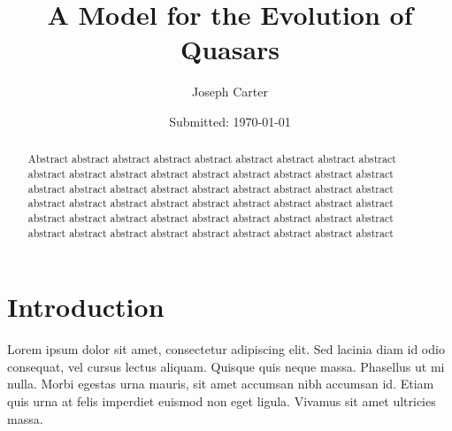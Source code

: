 \documentclass[12pt, onecolumn]{revtex4}    %
\begin{document}
                     


\title{A Model for the Evolution of Quasars} 
\date{Submitted: \today{}}
\author{Joseph Carter}

\begin{abstract}              
 
Abstract abstract abstract abstract abstract abstract abstract abstract abstract abstract abstract abstract abstract abstract abstract abstract abstract abstract abstract abstract abstract abstract abstract abstract abstract abstract abstract abstract abstract abstract abstract abstract abstract abstract abstract abstract abstract abstract abstract abstract abstract abstract abstract abstract abstract abstract abstract abstract abstract abstract abstract abstract abstract abstract 

\end{abstract}


\maketitle

\tableofcontents
\let\toc@pre\relax
\let\toc@post\relax

\newpage

\section{Introduction}

Lorem ipsum dolor sit amet, consectetur adipiscing elit. Sed lacinia diam id odio consequat, vel cursus lectus aliquam. Quisque quis neque massa. Phasellus ut mi nulla. Morbi egestas urna mauris, sit amet accumsan nibh accumsan id. Etiam quis urna at felis imperdiet euismod non eget ligula. Vivamus sit amet ultricies massa.
\end{document}
